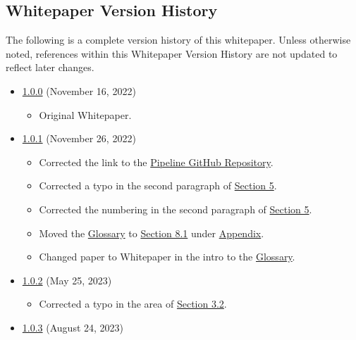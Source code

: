 \documentclass[class=article, crop=false]{standalone}
\begin{document}
\subsection{Whitepaper Version History}
The following is a complete version history of this whitepaper. Unless otherwise noted, references within this Whitepaper Version History are not updated to reflect later changes.

\begin{itemize}[topsep=0pt, itemsep=3pt,leftmargin=16pt]
    \item \href{https://github.com/BeanstalkFarms/Pipeline-Whitepaper/blob/master/version-history/pipeline1_0_0.pdf}{1.0.0} (November 16, 2022)
    \begin{itemize}
        \item Original Whitepaper.
    \end{itemize}
    \item \href{https://github.com/BeanstalkFarms/Pipeline-Whitepaper/blob/master/version-history/pipeline1_0_1.pdf}{1.0.1} (November 26, 2022)
    \begin{itemize}
        \item Corrected the link to the \href{https://github.com/BeanstalkFarms/Pipeline}{Pipeline GitHub Repository}.
        \item Corrected a typo in the second paragraph of \hyperlink{section.5}{Section 5}.
        \item Corrected the numbering in the second paragraph of \hyperlink{section.5}{Section 5}.
        \item Moved the \hyperlink{subsection.8.1}{Glossary} to \hyperlink{subsection.8.1}{Section 8.1} under \hyperlink{section.8}{Appendix}.
        \item Changed paper to Whitepaper in the intro to the \hyperlink{subsection.8.1}{Glossary}.
    \end{itemize}
    \item \href{https://github.com/BeanstalkFarms/Pipeline-Whitepaper/blob/master/version-history/pipeline1_0_2.pdf}{1.0.2} (May 25, 2023)
    \begin{itemize}
        \item Corrected a typo in the  area of \hyperlink{subsection.3.2}{Section 3.2}.
    \end{itemize}
    \item \href{https://github.com/BeanstalkFarms/Pipeline-Whitepaper/blob/master/version-history/pipeline1_0_3.pdf}{1.0.3} (August 24, 2023)
    \begin{itemize}

\end{itemize}
\end{itemize}
\end{document}
